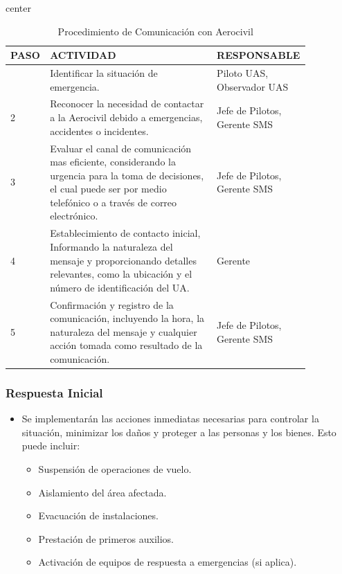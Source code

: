 \begin{table}[H]
\begin{adjustbox}{center}
\centering
\footnotesize
\begin{tabular}{|>{\centering\arraybackslash}m{0.06\linewidth}|m{0.55\linewidth}|>{\centering\arraybackslash}m{0.25\linewidth}|}
\hline
\rowcolor{gray!20}
\textbf{PASO} & \textbf{ACTIVIDAD} & \textbf{RESPONSABLE} \\
\hline

1 &
Identificar la situación de emergencia. &
Piloto UAS, Observador UAS \\
\hline

2 &
Reconocer la necesidad de contactar a la Aerocivil debido a emergencias, accidentes o incidentes. &
Jefe de Pilotos, Gerente SMS \\
\hline

3 &
Evaluar el canal de comunicación mas eficiente, considerando la urgencia para la toma de decisiones, el cual puede ser por medio telefónico o a través de correo electrónico. &
Jefe de Pilotos, Gerente SMS \\
\hline

4 &
Establecimiento de contacto inicial, Informando la naturaleza del mensaje y proporcionando detalles relevantes, como la ubicación y el número de identificación del UA. &
Gerente \\
\hline

5 &
Confirmación y registro de la comunicación, incluyendo la hora, la naturaleza del mensaje y cualquier acción tomada como resultado de la comunicación. &
Jefe de Pilotos, Gerente SMS \\
\hline

\end{tabular}
\end{adjustbox}
\caption{Procedimiento de Comunicación con Aerocivil}
\label{tab:responsabilidades_documentales}
\end{table}

\subsubsection{Respuesta Inicial}
\begin{itemize}
    \item Se implementarán las acciones inmediatas necesarias para controlar la situación, minimizar los daños y proteger a las personas y los bienes. Esto puede incluir:
    \begin{itemize}
        \item Suspensión de operaciones de vuelo.
        \item Aislamiento del área afectada.
        \item Evacuación de instalaciones.
        \item Prestación de primeros auxilios.
        \item Activación de equipos de respuesta a emergencias (si aplica).
    \end{itemize}
\end{itemize}

